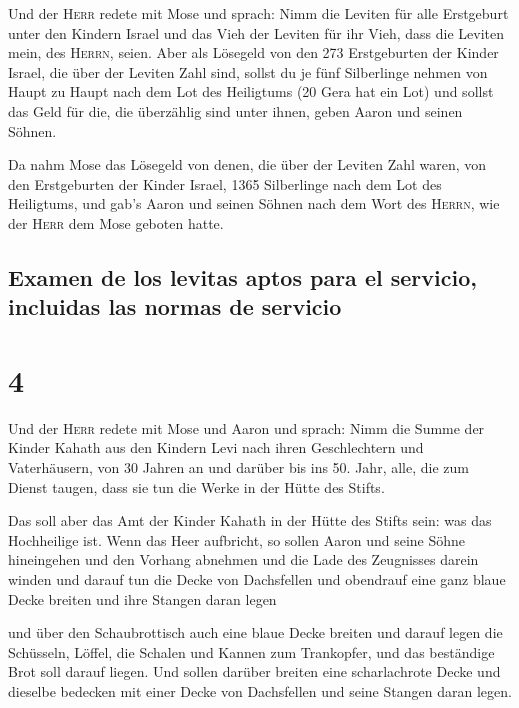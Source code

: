 Und der \textsc{Herr} redete mit Mose und sprach:
 Nimm die Leviten für alle Erstgeburt unter den Kindern
Israel und das Vieh der Leviten für ihr Vieh, dass die Leviten mein, des
\textsc{Herrn}, seien.  Aber als Lösegeld von den 273
Erstgeburten der Kinder Israel, die über der Leviten Zahl sind,
 sollst du je fünf Silberlinge nehmen von Haupt zu Haupt
nach dem Lot des Heiligtums (20 Gera hat ein Lot)  und
sollst das Geld für die, die überzählig sind unter ihnen, geben Aaron
und seinen Söhnen.

 Da nahm Mose das Lösegeld von denen, die über der
Leviten Zahl waren,  von den Erstgeburten der Kinder
Israel, 1365 Silberlinge nach dem Lot des Heiligtums, 
und gab's Aaron und seinen Söhnen nach dem Wort des \textsc{Herrn}, wie
der \textsc{Herr} dem Mose geboten hatte.

\hypertarget{examen-de-los-levitas-aptos-para-el-servicio-incluidas-las-normas-de-servicio}{%
\subsection{Examen de los levitas aptos para el servicio, incluidas las
normas de
servicio}\label{examen-de-los-levitas-aptos-para-el-servicio-incluidas-las-normas-de-servicio}}

\hypertarget{section-3}{%
\section{4}\label{section-3}}

 Und der \textsc{Herr} redete mit Mose und Aaron und
sprach:  Nimm die Summe der Kinder Kahath aus den Kindern
Levi nach ihren Geschlechtern und Vaterhäusern,  von 30
Jahren an und darüber bis ins 50. Jahr, alle, die zum Dienst taugen,
dass sie tun die Werke in der Hütte des Stifts.

 Das soll aber das Amt der Kinder Kahath in der Hütte des
Stifts sein: was das Hochheilige ist.  Wenn das Heer
aufbricht, so sollen Aaron und seine Söhne hineingehen und den Vorhang
abnehmen und die Lade des Zeugnisses darein winden  und
darauf tun die Decke von Dachsfellen und obendrauf eine ganz blaue Decke
breiten und ihre Stangen daran legen

 und über den Schaubrottisch auch eine blaue Decke breiten
und darauf legen die Schüsseln, Löffel, die Schalen und Kannen zum
Trankopfer, und das beständige Brot soll darauf liegen. 
Und sollen darüber breiten eine scharlachrote Decke und dieselbe
bedecken mit einer Decke von Dachsfellen und seine Stangen daran legen.

